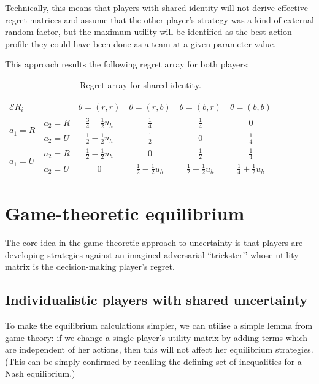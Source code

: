 \documentclass{article}
\theoremstyle{definition}
\begin{document}
Technically, this means that players with shared identity will not derive effective regret matrices and assume that the other player's strategy was a kind of external random factor, but the maximum utility will be identified as the best action profile they could have been done as a team at a given parameter value.

This approach results the following regret array for both players:

\begin{table}[H]
    \label{tab:EffectiveRegretSharedIdentity}
\begin{center}
\renewcommand{\arraystretch}{1.3} %
\begin{tabular}{|l l|c c c c|}
\hline
\multirow{1}{*}{$\mathcal{E}R_i$} & & $\theta=(r,r)$ & $\theta=(r,b)$ & $\theta=(b,r)$ & $\theta=(b,b)$\\
\hline
\multirow{2}{*}{$a_1=R$}
  & $a_2=R$ &
  $\frac{3}{4} -  \frac{1}{2} u_h$ & 
  $\frac{1}{4}$ & 
  $\frac{1}{4}$ & 
  $0$\\
\cline{2-6}
  & $a_2=U$ &
  $\frac{1}{2} - \frac{1}{2} u_h$ & 
  $\frac{1}{2}$ & 
  $0$ & 
  $\frac{1}{4}$\\
\hline
\multirow{2}{*}{$a_1=U$}
  & $a_2=R$ &
  $\frac{1}{2} - \frac{1}{2} u_h$ & 
  $0$ & 
  $\frac{1}{2}$ & 
  $\frac{1}{4}$\\
\cline{2-6}
  & $a_2=U$ &
  $0$ & 
  $\frac{1}{2} - \frac{1}{2} u_h$ & 
  $\frac{1}{2} - \frac{1}{2} u_h$ & 
  $\frac{1}{4} + \frac{1}{2} u_h$\\
\hline
\end{tabular}
\caption{Regret array for shared identity.}
\end{center}
\end{table}


\section{Game-theoretic equilibrium}

The core idea in the game-theoretic approach to uncertainty is that players are developing strategies against an imagined adversarial ``trickster’’ whose utility matrix is the decision-making player's regret.

\subsection{Individualistic players with shared uncertainty}

To make the equilibrium calculations simpler, we can utilise a simple lemma from game theory: if we change a single player's utility matrix by adding terms which are independent of her actions, then this will not affect her equilibrium strategies. (This can be simply confirmed by recalling the defining set of inequalities for a Nash equilibrium.)
\end{document}
